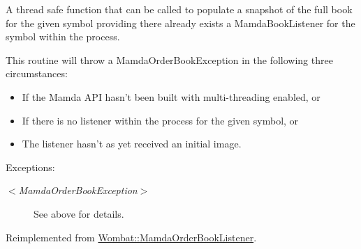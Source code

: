 A thread safe function that can be called to populate a snapshot of the full book for the given symbol providing there already exists a Mamda\-Book\-Listener for the symbol within the process. 

This routine will throw a Mamda\-Order\-Book\-Exception in the following three circumstances:\begin{itemize}
\item If the Mamda API hasn't been built with multi-threading enabled, or\item If there is no listener within the process for the given symbol, or\item The listener hasn't as yet received an initial image.\end{itemize}


\begin{Desc}
\item[Exceptions:]
\begin{description}
\item[{\em $<$Mamda\-Order\-Book\-Exception$>$}]See above for details. \end{description}
\end{Desc}


Reimplemented from \hyperlink{classWombat_1_1MamdaOrderBookListener_da7f0348273e2877d9a27ae48406a59a}{Wombat::Mamda\-Order\-Book\-Listener}.